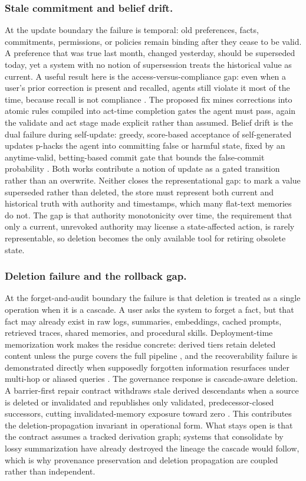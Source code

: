 \subsubsection{Stale commitment and belief drift.}
At the update boundary the failure is temporal: old preferences, facts, commitments, permissions, or policies remain binding after they cease to be valid. A preference that was true last month, changed yesterday, should be superseded today, yet a system with no notion of supersession treats the historical value as current. A useful result here is the access-versus-compliance gap: even when a user's prior correction is present and recalled, agents still violate it most of the time, because recall is not compliance \citep{zhou2026usercorrections}. The proposed fix mines corrections into atomic rules compiled into act-time completion gates the agent must pass, again the validate and act stage made explicit rather than assumed. Belief drift is the dual failure during self-update: greedy, score-based acceptance of self-generated updates p-hacks the agent into committing false or harmful state, fixed by an anytime-valid, betting-based commit gate that bounds the false-commit probability \citep{shawn2026pace}. Both works contribute a notion of update as a gated transition rather than an overwrite. Neither closes the representational gap: to mark a value superseded rather than deleted, the store must represent both current and historical truth with authority and timestamps, which many flat-text memories do not. The gap is that authority monotonicity over time, the requirement that only a current, unrevoked authority may license a state-affected action, is rarely representable, so deletion becomes the only available tool for retiring obsolete state.

\subsubsection{Deletion failure and the rollback gap.}
At the forget-and-audit boundary the failure is that deletion is treated as a single operation when it is a cascade. A user asks the system to forget a fact, but that fact may already exist in raw logs, summaries, embeddings, cached prompts, retrieved traces, shared memories, and procedural skills. Deployment-time memorization work makes the residue concrete: derived tiers retain deleted content unless the purge covers the full pipeline \citep{chen2026deploymenttimememorization}, and the recoverability failure is demonstrated directly when supposedly forgotten information resurfaces under multi-hop or aliased queries \citep{shah2026unlearningmirage}. The governance response is cascade-aware deletion. A barrier-first repair contract withdraws stale derived descendants when a source is deleted or invalidated and republishes only validated, predecessor-closed successors, cutting invalidated-memory exposure toward zero \citep{zhao2026memorepair}. This contributes the deletion-propagation invariant in operational form. What stays open is that the contract assumes a tracked derivation graph; systems that consolidate by lossy summarization have already destroyed the lineage the cascade would follow, which is why provenance preservation and deletion propagation are coupled rather than independent.

